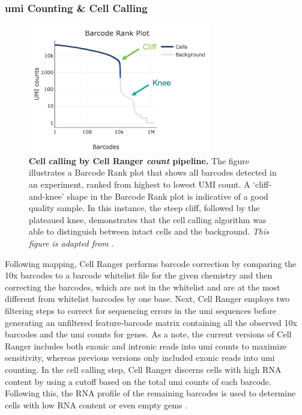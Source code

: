 \subsubsection{\gls{umi} Counting \& Cell Calling}
\begin{figure}
    \centering
    \includegraphics[width=8cm]{Chapter1/Fig/F1-10-03.png}
    \caption[Cell calling by Cell Ranger \textit{count}]{\textbf{Cell calling by Cell Ranger \textit{count} pipeline.} The figure illustrates a Barcode Rank plot that shows all barcodes detected in an experiment, ranked from highest to lowest UMI count. A `cliff-and-knee' shape in the Barcode Rank plot is indicative of a good quality sample. In this instance, the steep cliff, followed by the plateaued knee, demonstrates that the cell calling algorithm was able to distinguish between intact cells and the background. \textit{This figure is adapted from }\textbf{\cite{noauthor_barcode_nodate}}.}
    \label{fig:chp1_cellcall}
\end{figure}

Following mapping, Cell Ranger performs barcode correction by comparing the 10x barcodes to a barcode whitelist file for the given chemistry and then correcting the barcodes, which are not in the whitelist and are at the most different from whitelist barcodes by one base. Next, Cell Ranger employs two filtering steps to correct for sequencing errors in the \gls{umi} sequences before generating an unfiltered feature-barcode matrix containing all the observed 10x barcodes and the \gls{umi} counts for genes. As a note, the current versions of Cell Ranger includes both exonic and intronic reads into \gls{umi} counts to maximize sensitivity, whereas previous versions only included exonic reads into \gls{umi} counting. In the cell calling step, Cell Ranger discerns cells with high RNA content by using a cutoff based on the total \gls{umi} counts of each barcode. Following this, the RNA profile of the remaining barcodes is used to determine cells with low RNA content or even empty \gls{gem}s \textbf{\cite{noauthor_cell_nodate}}.


